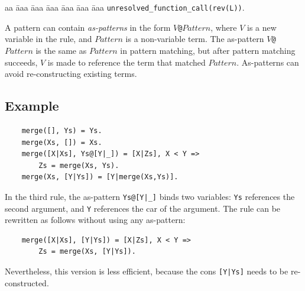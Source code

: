 \begin{tabbing}
aa \= aaa \= aaa \= aaa \= aaa \= aaa \= aaa \kill
\> \> \texttt{unresolved\_function\_call(rev(L))}.
\end{tabbing}

A pattern can contain \emph{as-patterns} in the form \texttt{$V$@$Pattern$}, where $V$ is a new variable in the rule, and $Pattern$ is a non-variable term. The as-pattern \texttt{$V$@$Pattern$} is the same as \texttt{$Pattern$} in pattern matching, but after pattern matching succeeds, $V$ is made to reference the term that matched $Pattern$. As-patterns can avoid re-constructing existing terms.

\subsection*{Example}
\begin{verbatim}
    merge([], Ys) = Ys.
    merge(Xs, []) = Xs.
    merge([X|Xs], Ys@[Y|_]) = [X|Zs], X < Y => 
        Zs = merge(Xs, Ys). 
    merge(Xs, [Y|Ys]) = [Y|merge(Xs,Ys)].
\end{verbatim}
In the third rule, the as-pattern \texttt{Ys@[Y|\_]} binds two variables: \texttt{Ys} references the second argument, and \texttt{Y} references the car of the argument. The rule can be rewritten as follows without using any as-pattern:
\begin{verbatim}
    merge([X|Xs], [Y|Ys]) = [X|Zs], X < Y => 
        Zs = merge(Xs, [Y|Ys]). 
\end{verbatim}
Nevertheless, this version is less efficient, because the cons \texttt{[Y|Ys]} needs to be re-constructed.


